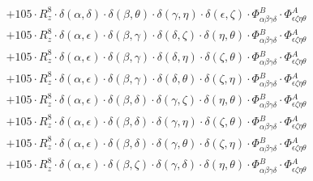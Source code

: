 \documentclass{article}
\begin{document}
\begin{equation}
\begin{array}{c}
 \\[0.2em] 		 + 105 \cdot R_{z}^{8} \cdot \delta{}\left(\alpha{}, \delta{}\right) \cdot \delta{}\left(\beta{}, \theta{}\right) \cdot \delta{}\left(\gamma{}, \eta{}\right) \cdot \delta{}\left(\epsilon{}, \zeta{}\right) \cdot \Phi{}^{B}_{\alpha{}\beta{}\gamma{}\delta{}} \cdot \Phi{}^{A}_{\epsilon{}\zeta{}\eta{}\theta{}} 
 \\[0.2em] 		 + 105 \cdot R_{z}^{8} \cdot \delta{}\left(\alpha{}, \epsilon{}\right) \cdot \delta{}\left(\beta{}, \gamma{}\right) \cdot \delta{}\left(\delta{}, \zeta{}\right) \cdot \delta{}\left(\eta{}, \theta{}\right) \cdot \Phi{}^{B}_{\alpha{}\beta{}\gamma{}\delta{}} \cdot \Phi{}^{A}_{\epsilon{}\zeta{}\eta{}\theta{}} 
 \\[0.2em] 		 + 105 \cdot R_{z}^{8} \cdot \delta{}\left(\alpha{}, \epsilon{}\right) \cdot \delta{}\left(\beta{}, \gamma{}\right) \cdot \delta{}\left(\delta{}, \eta{}\right) \cdot \delta{}\left(\zeta{}, \theta{}\right) \cdot \Phi{}^{B}_{\alpha{}\beta{}\gamma{}\delta{}} \cdot \Phi{}^{A}_{\epsilon{}\zeta{}\eta{}\theta{}} 
 \\[0.2em] 		 + 105 \cdot R_{z}^{8} \cdot \delta{}\left(\alpha{}, \epsilon{}\right) \cdot \delta{}\left(\beta{}, \gamma{}\right) \cdot \delta{}\left(\delta{}, \theta{}\right) \cdot \delta{}\left(\zeta{}, \eta{}\right) \cdot \Phi{}^{B}_{\alpha{}\beta{}\gamma{}\delta{}} \cdot \Phi{}^{A}_{\epsilon{}\zeta{}\eta{}\theta{}} 
 \\[0.2em] 		 + 105 \cdot R_{z}^{8} \cdot \delta{}\left(\alpha{}, \epsilon{}\right) \cdot \delta{}\left(\beta{}, \delta{}\right) \cdot \delta{}\left(\gamma{}, \zeta{}\right) \cdot \delta{}\left(\eta{}, \theta{}\right) \cdot \Phi{}^{B}_{\alpha{}\beta{}\gamma{}\delta{}} \cdot \Phi{}^{A}_{\epsilon{}\zeta{}\eta{}\theta{}} 
 \\[0.2em] 		 + 105 \cdot R_{z}^{8} \cdot \delta{}\left(\alpha{}, \epsilon{}\right) \cdot \delta{}\left(\beta{}, \delta{}\right) \cdot \delta{}\left(\gamma{}, \eta{}\right) \cdot \delta{}\left(\zeta{}, \theta{}\right) \cdot \Phi{}^{B}_{\alpha{}\beta{}\gamma{}\delta{}} \cdot \Phi{}^{A}_{\epsilon{}\zeta{}\eta{}\theta{}} 
 \\[0.2em] 		 + 105 \cdot R_{z}^{8} \cdot \delta{}\left(\alpha{}, \epsilon{}\right) \cdot \delta{}\left(\beta{}, \delta{}\right) \cdot \delta{}\left(\gamma{}, \theta{}\right) \cdot \delta{}\left(\zeta{}, \eta{}\right) \cdot \Phi{}^{B}_{\alpha{}\beta{}\gamma{}\delta{}} \cdot \Phi{}^{A}_{\epsilon{}\zeta{}\eta{}\theta{}} 
 \\[0.2em] 		 + 105 \cdot R_{z}^{8} \cdot \delta{}\left(\alpha{}, \epsilon{}\right) \cdot \delta{}\left(\beta{}, \zeta{}\right) \cdot \delta{}\left(\gamma{}, \delta{}\right) \cdot \delta{}\left(\eta{}, \theta{}\right) \cdot \Phi{}^{B}_{\alpha{}\beta{}\gamma{}\delta{}} \cdot \Phi{}^{A}_{\epsilon{}\zeta{}\eta{}\theta{}} 

\end{array}
\end{equation}
\end{document}
